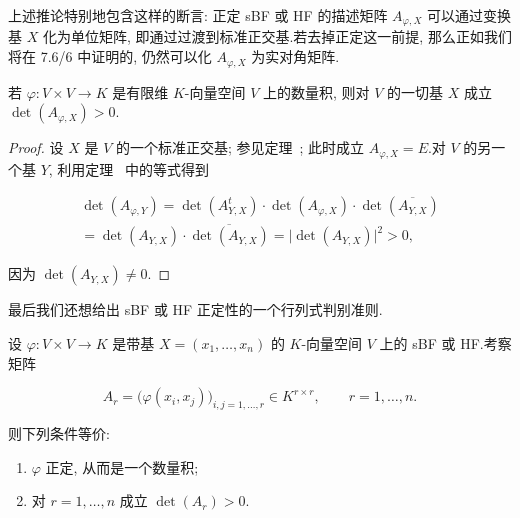 上述推论特别地包含这样的断言: 正定 sBF 或 HF 的描述矩阵 $A_{\varphi, X}$ 可以通过变换基 $X$ 化为单位矩阵, 即通过过渡到标准正交基.若去掉正定这一前提, 那么正如我们将在 7.6/6 中证明的, 仍然可以化 $A_{\varphi, X}$ 为实对角矩阵.

\begin{corollary}\label{cor:7.3.7}
若 $\varphi \colon V \times V \longrightarrow K$ 是有限维 $K$-向量空间 $V$ 上的数量积, 则对 $V$ 的一切基 $X$ 成立 $\det(A_{\varphi, X}) > 0$.
\end{corollary}

\begin{proof}
设 $X$ 是 $V$ 的一个标准正交基; 参见定理~; 此时成立 $A_{\varphi, X} = E$.对 $V$ 的另一个基 $Y$, 利用定理~ 中的等式得到

\[
\begin{array}{c}
\det(A_{\varphi, Y}) = \det(A_{Y, X}^{t}) \cdot \det(A_{\varphi, X}) \cdot \det(\overline{A_{Y, X}}) \\
= \det(A_{Y, X}) \cdot \overline{\det(A_{Y, X})} = \bigl|\det(A_{Y, X})\bigr|^2 > 0,
\end{array}
\]

因为 $\det(A_{Y, X}) \neq 0$.
\end{proof}

最后我们还想给出 sBF 或 HF 正定性的一个行列式判别准则.

\begin{theorem}\label{thm:7.3.8}
设 $\varphi \colon V \times V \longrightarrow K$ 是带基 $X = (x_1, \ldots, x_n)$ 的 $K$-向量空间 $V$ 上的 sBF 或 HF.考察矩阵

\[
A_{r} = \bigl(\varphi(x_i, x_j)\bigr)_{i, j = 1, \ldots, r} \in K^{r \times r}, \qquad r = 1, \ldots, n\text{.}
\]

则下列条件等价:
\begin{enumerate}
\item[(i)] $\varphi$ 正定, 从而是一个数量积;
\item[(ii)] 对 $r = 1, \ldots, n$ 成立 $\det(A_r) > 0$.
\end{enumerate}
\end{theorem}

